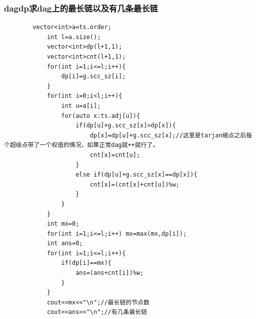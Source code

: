 \documentclass[10pt, a4paper, twocolumn]{article} %
\begin{document}
    \subsubsection{dagdp求dag上的最长链以及有几条最长链}
    \begin{lstlisting}
        vector<int>a=ts.order;
			int l=a.size();
			vector<int>dp(l+1,1);
			vector<int>cnt(l+1,1);
			for(int i=1;i<=l;i++){
				dp[i]=g.scc_sz[i];
			}
			for(int i=0;i<l;i++){
				int u=a[i];
				for(auto x:ts.adj[u]){
					if(dp[u]+g.scc_sz[x]>dp[x]){
						dp[x]=dp[u]+g.scc_sz[x];//这里是tarjan缩点之后每个超级点带了一个权值的情况，如果正常dag就++就行了。
						cnt[x]=cnt[u];
					}
					else if(dp[u]+g.scc_sz[x]==dp[x]){
						cnt[x]=(cnt[x]+cnt[u])%w;
					}
				}
			}
			int mx=0;
			for(int i=1;i<=l;i++) mx=max(mx,dp[i]);
			int ans=0;
			for(int i=1;i<=l;i++){
				if(dp[i]==mx){
					ans=(ans+cnt[i])%w;
				}
			}
			cout<<mx<<"\n";//最长链的节点数
			cout<<ans<<"\n";//有几条最长链
    \end{lstlisting}
\end{document}
